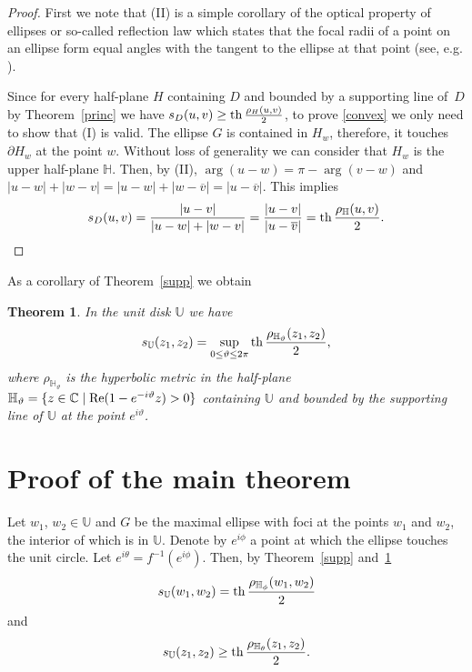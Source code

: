 \documentclass[12pt,a4paper]{amsart}
\newtheorem{theorem}{Theorem}
\def\Re{\mathop{\rm Re}\nolimits}
\def\th{\mathop{\rm th}\nolimits}
\begin{document}
\begin{proof} First we note that (II) is a simple corollary of the optical property of ellipses or so-called reflection law which states that the focal radii of a point on an ellipse form equal angles with the tangent to the ellipse at that point (see, e.g. \cite{zw}).

Since for every  half-plane $H$ containing $D$ and bounded by a supporting line of~$D$ by Theorem~\ref{princ} we have  $s_D(u,v)\ge\th\frac{\rho_{H}(u,v)}{2}$, to prove  \eqref{convex} we only need to show that (I) is valid. The ellipse $G$ is contained in $H_w$, therefore, it touches $\partial H_w$ at the point $w$. Without loss of generality we can consider that $H_w$ is the upper half-plane $\mathbb{H}$. Then, by (II), $\arg(u-w)=\pi-\arg(v-w)$ and $|u-w|+|w-v|=|u-w|+|w-\overline{v}|=|u-\overline{v}|$. This implies
$$
s_D(u,v)=\frac{|u-v|}{|u-w|+|w-v|}=\frac{|u-v|}{|u-\overline{v}|}=\th\frac{\rho_{\mathbb{H}}(u,v)}{2}.
$$
\end{proof}

As a corollary of Theorem~\ref{supp} we obtain

\begin{theorem} \label{supp1}
In the unit disk $\mathbb{U}$ we have
$$
s_\mathbb{U}(z_1,z_2)=\sup_{0\le\vartheta\le 2\pi} \th\frac{\rho_{\mathbb{H}_\vartheta}(z_1,z_2)}{2},
$$
where $\rho_{\mathbb{H}_\vartheta}$ is the hyperbolic metric in the half-plane ${\mathbb{H}_\vartheta}=\{z\in \mathbb{C} \mid \Re(1-e^{-i\vartheta}z)>0\}$ containing $\mathbb{U}$ and bounded by the supporting line of $\mathbb{U}$ at  the point $e^{i\vartheta}$.
\end{theorem}

\section{Proof of the main theorem}

Let $w_1$, $w_2\in \mathbb{U}$ and $G$ be the maximal ellipse with foci at the points $w_1$ and $w_2$, the interior  of which is in $\mathbb{U}$. Denote by $e^{i\phi}$  a point at which the ellipse touches the unit circle. Let $e^{i\theta}=f^{-1}(e^{i\phi})$.  Then, by Theorem~\ref{supp} and~\ref{supp1}
\begin{equation}\label{sw}
s_{\mathbb{U}}(w_1,w_2)=\th\frac{\rho_{\mathbb{H}_\phi}(w_1,w_2)}{2}
\end{equation}
and
\begin{equation}\label{sz}
s_\mathbb{U}(z_1,z_2)\ge \th\frac{\rho_{\mathbb{H}_\theta}(z_1,z_2)}{2}.
\end{equation}
\end{document}

